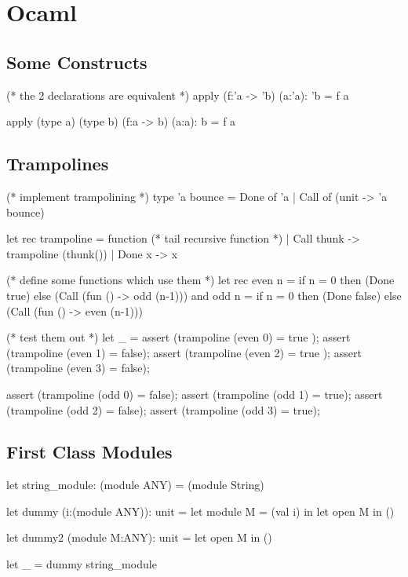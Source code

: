 \chapter{Ocaml}


\section{Some Constructs}

\begin{ocaml}
  (* the 2 declarations are equivalent *)
  apply (f:'a -> 'b) (a:'a): 'b =
    f a

  apply (type a) (type b) (f:a -> b) (a:a): b =
    f a
\end{ocaml}


\section{Trampolines}

\begin{ocaml}
  (* implement trampolining *)
  type 'a bounce = Done of 'a | Call of (unit -> 'a bounce)

  let rec trampoline = function  (* tail recursive function *)
    | Call thunk -> trampoline (thunk())
    | Done x     -> x

  (* define some functions which use them *)
  let rec
    even n = if n = 0 then (Done true) else (Call (fun () -> odd (n-1)))
  and
    odd n = if n = 0 then (Done false) else (Call (fun () -> even (n-1)))

  (* test them out *)
  let _ =
    assert (trampoline (even 0) = true );
    assert (trampoline (even 1) = false);
    assert (trampoline (even 2) = true );
    assert (trampoline (even 3) = false);

    assert (trampoline (odd 0) = false);
    assert (trampoline (odd 1) = true);
    assert (trampoline (odd 2) = false);
    assert (trampoline (odd 3) = true);
\end{ocaml}





\section{First Class Modules}


\begin{ocaml}
  let string_module: (module ANY) = (module String)

  let dummy (i:(module ANY)): unit =
    let module M = (val i) in
    let open M in
    ()

  let dummy2 (module M:ANY): unit =
    let open M in
    ()

  let _ = dummy string_module
\end{ocaml}


